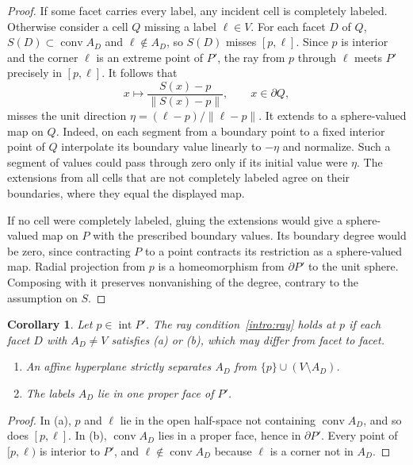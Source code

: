 \documentclass[11pt]{amsart}
\newtheorem{cor}[thm]{Corollary}
\theoremstyle{definition}
\theoremstyle{remark}
\numberwithin{equation}{section}
\DeclareMathOperator{\conv}{conv}
\begin{document}
\begin{proof}
If some facet carries every label, any incident cell is completely labeled. Otherwise consider a cell $Q$ missing a label $\ell\in V$. For each facet $D$ of $Q$, $S(D)\subset\conv A_D$ and $\ell\notin A_D$, so $S(D)$ misses $[p,\ell]$. Since $p$ is interior and the corner $\ell$ is an extreme point of $P'$, the ray from $p$ through $\ell$ meets $P'$ precisely in $[p,\ell]$. It follows that
\[
x\longmapsto \frac{S(x)-p}{\|S(x)-p\|},\qquad x\in\partial Q,
\]
misses the unit direction $\eta=(\ell-p)/\|\ell-p\|$. It extends to a sphere-valued map on $Q$. Indeed, on each segment from a boundary point to a fixed interior point of $Q$ interpolate its boundary value linearly to $-\eta$ and normalize. Such a segment of values could pass through zero only if its initial value were $\eta$. The extensions from all cells that are not completely labeled agree on their boundaries, where they equal the displayed map.

If no cell were completely labeled, gluing the extensions would give a sphere-valued map on $P$ with the prescribed boundary values. Its boundary degree would be zero, since contracting $P$ to a point contracts its restriction as a sphere-valued map. Radial projection from $p$ is a homeomorphism from $\partial P'$ to the unit sphere. Composing with it preserves nonvanishing of the degree, contrary to the assumption on $S$.
\end{proof}

\begin{cor}\label{cor:YS3}
Let $p\in\operatorname{int}P'$. The ray condition~\eqref{intro:ray} holds at $p$ if each facet $D$ with $A_D\ne V$ satisfies (a) or (b), which may differ from facet to facet.
\begin{enumerate}
\item[(a)] An affine hyperplane strictly separates $A_D$ from $\{p\}\cup(V\setminus A_D)$.
\item[(b)] The labels $A_D$ lie in one proper face of $P'$.
\end{enumerate}
\end{cor}

\begin{proof}
In (a), $p$ and $\ell$ lie in the open half-space not containing $\conv A_D$, and so does $[p,\ell]$. In (b), $\conv A_D$ lies in a proper face, hence in $\partial P'$. Every point of $[p,\ell)$ is interior to $P'$, and $\ell\notin\conv A_D$ because $\ell$ is a corner not in $A_D$.
\end{proof}
\end{document}
